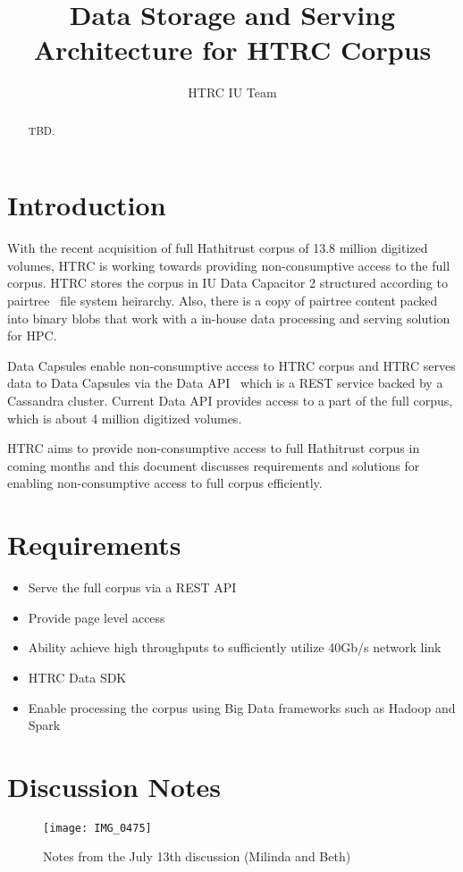 \documentclass{thesis}
\title{Data Storage and Serving Architecture for HTRC Corpus}
\author{HTRC IU Team}
\begin{document}
\maketitle

\tableofcontents

\begin{abstract}
TBD.
\end{abstract}

\section{Introduction}
With the recent acquisition of full Hathitrust corpus of 13.8 million digitized volumes, HTRC is working towards providing non-consumptive access to the full corpus. HTRC stores the corpus in IU Data Capacitor 2 structured according to pairtree~\cite{pairtree} file system heirarchy. Also, there is a copy of pairtree content packed into binary blobs that work with a in-house data processing and serving solution for HPC.

Data Capsules enable non-consumptive access to HTRC corpus and HTRC serves data to Data Capsules via the Data API~\cite{dataapi} which is a REST service backed by a Cassandra cluster. Current Data API provides access to a part of the full corpus, which is about 4 million digitized volumes.

HTRC aims to provide non-consumptive access to full Hathitrust corpus in coming months and this document discusses requirements and solutions for enabling non-consumptive access to full corpus efficiently.

\section{Requirements}

\begin{itemize}
	\item Serve the full corpus via a REST API
	\item Provide page level access
	\item Ability achieve high throughputs to sufficiently utilize 40Gb/s network link
	\item HTRC Data SDK
	\item Enable processing the corpus using Big Data frameworks such as Hadoop and Spark
\end{itemize}
    

\section{Discussion Notes}

\begin{figure}[ht!]
    \centering
    \texttt{[image: IMG\_0475]}
    \caption{Notes from the July 13th discussion (Milinda and Beth)}
    \label{fig:notes}
\end{figure}




\end{document}
